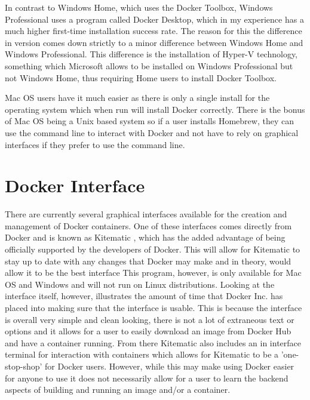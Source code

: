 In contrast to Windows Home, which uses the Docker Toolbox, Windows Professional uses a program called Docker Desktop, which in my experience has a much higher first-time installation success rate. The reason for this the difference in version comes down strictly to a minor difference between Windows Home and Windows Professional. This difference is the installation of Hyper-V technology, something which Microsoft allows to be installed on Windows Professional but not Windows Home, thus requiring Home users to install Docker Toolbox.

Mac OS users have it much easier as there is only a single install for the operating system which when run will install Docker correctly. There is the bonus of Mac OS being a Unix based system so if a user installs Homebrew, they can use the command line to interact with Docker and not have to rely on graphical interfaces if they prefer to use the command line.

\section{Docker Interface}
\label{sec:interface}

There are currently several graphical interfaces available for the creation and management of Docker containers. One of these interfaces comes directly from Docker and is known as Kitematic \cite{kitematic}, which has the added advantage of being officially supported by the developers of Docker. This will allow for Kitematic to stay up to date with any changes that Docker may make and in theory, would allow it to be the best interface This program, however, is only available for Mac OS and Windows and will not run on Linux distributions. Looking at the interface itself, however, illustrates the amount of time that Docker Inc. has placed into making sure that the interface is usable. This is because the interface is overall very simple and clean looking, there is not a lot of extraneous text or options and it allows for a user to easily download an image from Docker Hub and have a container running. From there Kitematic also includes an in interface terminal for interaction with containers which allows for Kitematic to be a 'one-stop-shop' for Docker users. However, while this may make using Docker easier for anyone to use it does not necessarily allow for a user to learn the backend aspects of building and running an image and/or a container.

